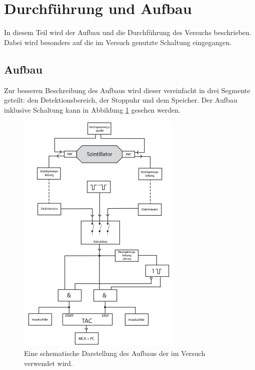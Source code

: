 \newpage
\section{Durchführung und Aufbau}
\label{sec:durchfuerung}
In diesem Teil wird der Aufbau und die Durchführung des Versuchs beschrieben.
Dabei wird besonders auf die im Versuch genutzte Schaltung eingegangen.
\FloatBarrier
\subsection{Aufbau}
Zur besseren Beschreibung des Aufbaus wird dieser vereinfacht in drei Segmente geteilt: den Detektionsbereich, der Stoppuhr und dem Speicher.
Der Aufbau inklusive Schaltung kann in Abbildung \ref{fig:aufbau} gesehen werden.
\begin{figure}
    \centering
    \includegraphics[width=0.7\textwidth]{data/aufbau.png}
    \caption{Eine schematische Darstellung des Aufbaus der im Versuch verwendet wird. \cite{V01}}
    \label{fig:aufbau}
\end{figure}
\FloatBarrier
